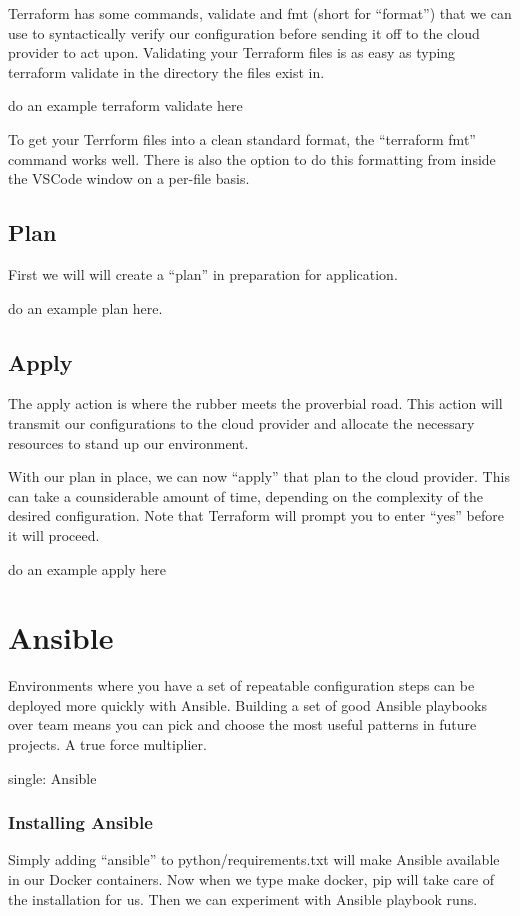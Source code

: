 \justify{}
Terraform has some commands, validate and fmt (short for ``format'') that
we can use to syntactically verify our configuration before sending it
off to the cloud provider to act upon. Validating your Terraform files
is as easy as typing terraform validate in the directory the files exist
in.

do an example terraform validate here

To get your Terrform files into a clean standard format, the
``terraform fmt'' command works well. There is also the option to do this
formatting from inside the VSCode window on a per-file basis.

\subsection{Plan}

First we will will create a ``plan'' in preparation for application.

do an example plan here.

\subsection{Apply}

The apply action is where the rubber meets the proverbial road. This
action will transmit our configurations to the cloud provider and
allocate the necessary resources to stand up our environment.

With our plan in place, we can now ``apply'' that plan to the cloud
provider. This can take a counsiderable amount of time, depending on the
complexity of the desired configuration. Note that Terraform will prompt
you to enter ``yes'' before it will proceed.

do an example apply here

\section{Ansible}

\justify{}
Environments where you have a set of repeatable configuration steps can
be deployed more quickly with Ansible. Building a set of good Ansible
playbooks over team means you can pick and choose the most useful
patterns in future projects. A true force multiplier.

single: Ansible

\subsubsection{Installing Ansible}
\justify{}
Simply adding ``ansible'' to python/requirements.txt will make Ansible
available in our Docker containers. Now when we type make docker, pip
will take care of the installation for us. Then we can experiment with
Ansible playbook runs.

